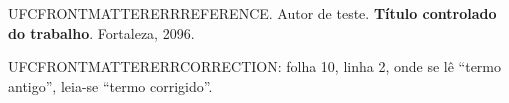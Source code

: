 \noindent UFCFRONTMATTERERRREFERENCE. Autor de teste. \textbf{Título controlado do trabalho}. Fortaleza, 2096.

\noindent UFCFRONTMATTERERRCORRECTION: folha 10, linha 2, onde se lê ``termo antigo'', leia-se ``termo corrigido''.

